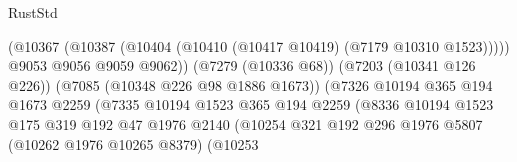 \begin{lexlean}{RustStd}
\begin{coremodule}
                                                    (@10367
                                                      (@10387
                                                        (@10404
                                                          (@10410
                                                            (@10417 @10419)
                                                            (@7179 @10310 @1523)))))
                                                    @9053
                                                    @9056
                                                    @9059
                                                    @9062))
                                                (@7279 (@10336 @68))
                                                (@7203 (@10341 @126 @226))
                                                (@7085 (@10348 @226 @98 @1886 @1673))
                                                (@7326
                                                  @10194
                                                  @365
                                                  @194
                                                  @1673
                                                  @2259
                                                  (@7335
                                                    @10194
                                                    @1523
                                                    @365
                                                    @194
                                                    @2259
                                                    (@8336
                                                      @10194
                                                      @1523
                                                      @175
                                                      @319
                                                      @192
                                                      @47
                                                      @1976
                                                      @2140
                                                      (@10254
                                                        @321
                                                        @192
                                                        @296
                                                        @1976
                                                        @5807
                                                        (@10262 @1976 @10265 @8379)
                                                        (@10253

\end{coremodule}
\end{lexlean}
